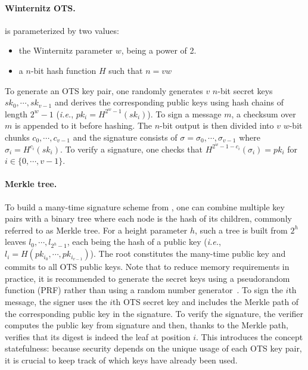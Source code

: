 \paragraph{Winternitz OTS.}
\WOTS is parameterized by two values:
\begin{itemize}
	\item the Winternitz parameter $w$, being a power of 2.%
	\item a $n$-bit hash function $H$ such that $n=vw$
\end{itemize}
To generate an OTS key pair, one randomly generates $v$ $n$-bit secret keys  $sk_0,\cdots,sk_{v-1}$ and derives the corresponding public keys using hash chains of length $2^w-1$ (\textit{i.e.}, $pk_i = H^{2^w-1}(sk_i)$).
To sign a message $m$, a checksum over $m$ is appended to it before hashing.
The $n$-bit output is then divided into $v$ $w$-bit chunks $c_0,\cdots,c_{v-1}$ and the signature consists of $\sigma = \sigma_0, \cdots, \sigma_{v-1}$ where $\sigma_i = H^{c_i}(sk_i)$. %
To verify a signature, one checks that $H^{2^w-1-c_i}(\sigma_i) = pk_i$ for $i \in \{0,\cdots,v-1\}$.


\paragraph{Merkle tree.}
To build a many-time signature scheme from \WOTS, one can combine multiple key pairs with a binary tree where each node is the hash of its children, commonly referred to as Merkle tree.
For a height parameter $h$, such a tree is built from $2^h$ leaves $l_0,\cdots,l_{2^h-1}$,  each being the hash of a \WOTS public key (\textit{i.e.}, $l_i = H(pk_{i_0}, \cdots, pk_{i_{v-1}})$).
The root constitutes the many-time public key and commits to all OTS public keys.
Note that to reduce memory requirements in practice, it is recommended to generate the \WOTS secret keys using a pseudorandom function (PRF) rather than using a random number generator~\cite{RFC8391}.
To sign the $i$th message, the signer uses the $i$th OTS secret key and includes the Merkle path of the corresponding public key in the signature.
To verify the signature, the verifier computes the public key from \WOTS signature and then, thanks to the Merkle path, verifies that its digest is indeed the leaf at position $i$.
This introduces the concept statefulness: because security depends on the unique usage of each OTS key pair, it is crucial to keep track of which keys have already been used.


